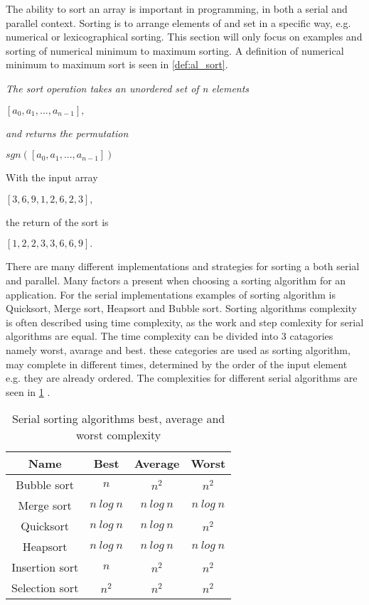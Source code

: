 The ability to sort an array is important in programming, in both a serial and parallel context. Sorting is to arrange elements of and set in a specific way, e.g. numerical or lexicographical sorting. This section will only focus on examples and sorting of numerical minimum to maximum sorting. A definition of numerical minimum to maximum sort is seen in \cref{def:al_sort}.   

\begin{definition}
	\label{def:al_sort}
	\textit{The sort operation takes an unordered set of n elements}
	\begin{center}
		$[a_0,a_1,...,a_{n-1}],$
	\end{center}
	\textit{and returns the permutation}
	\begin{center}
		$sgn([a_0,a_1,...,a_{n-1}])$
	\end{center}
\end{definition}
\begin{example}
	With the input array
	\begin{center}
		$[3,6,9,1,2,6,2,3],$
	\end{center}
	the return of the sort is
	\begin{center}
		$[1,2,2,3,3,6,6,9].$
	\end{center}
\end{example}

There are many different implementations and strategies for sorting a both serial and parallel. Many factors a present when choosing a sorting algorithm for an application. For the serial implementations examples of sorting algorithm is Quicksort, Merge sort, Heapsort and Bubble sort. Sorting algorithms complexity is often described using time complexity, as the work and step comlexity for serial algorithms are equal. The time complexity can be divided into 3 catagories namely worst, avarage and best. these categories are used as sorting algorithm, may complete in different times, determined by the order of the input element e.g. they are already ordered. The complexities for different serial algorithms are seen in \cref{tab:serial_sort} \cite{wiki:sort}. 

\begin{table}[ht]
	\centering
	\caption{Serial sorting algorithms best, average and worst complexity}
	\label{tab:serial_sort}
	\begin{tabular}{|c|c|c|c|}
		\hline
		Name           & Best       & Average   & Worst     \\ \hline
		Bubble sort    & $n$        & $n^2$     & $n^2$     \\ \hline
		Merge sort     & $n~log~n$  & $n~log~n$ & $n~log~n$ \\ \hline
		Quicksort      & $n~log~n$  & $n~log~n$ & $n^2$     \\ \hline
		Heapsort       & $n~log~n$  & $n~log~n$ & $n~log~n$ \\ \hline
		Insertion sort & $n$        & $n^2$     & $n^2$     \\ \hline
		Selection sort & $n^2$      & $n^2$     & $n^2$     \\ \hline
	\end{tabular}
\end{table}


